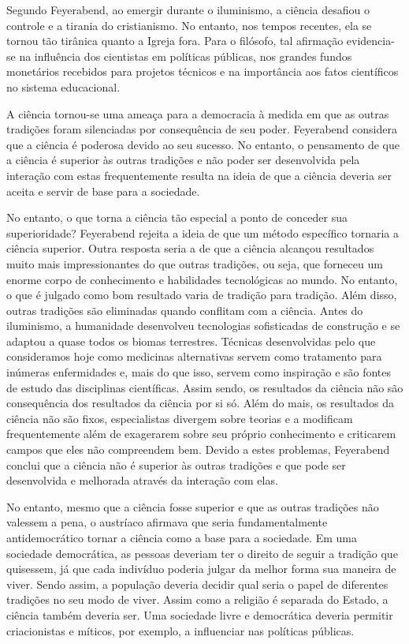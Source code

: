 \documentclass[12pt]{report}
\begin{document}
			Segundo Feyerabend, ao emergir durante o iluminismo, a ciência desafiou o controle e a tirania do cristianismo.
			No entanto, nos tempos recentes, ela se tornou tão tirânica quanto a Igreja fora.
			Para o filósofo, tal afirmação evidencia-se na influência dos cientistas em políticas públicas, nos grandes fundos monetários recebidos para projetos técnicos e na importância aos fatos científicos no sistema educacional.
		
			A ciência tornou-se uma ameaça para a democracia à medida em que as outras tradições foram silenciadas por consequência de seu poder.
			Feyerabend considera que a ciência é poderosa devido ao seu sucesso.
			No entanto, o pensamento de que a ciência é superior às outras tradições e não poder ser desenvolvida pela interação com estas frequentemente resulta na ideia de que a ciência deveria ser aceita e servir de base para a sociedade.
		
			No entanto, o que torna a ciência tão especial a ponto de conceder sua superioridade? Feyerabend rejeita a ideia de que um método específico tornaria a ciência superior.
			Outra resposta seria a de que a ciência alcançou resultados muito mais impressionantes do que outras tradições, ou seja, que forneceu um enorme corpo de conhecimento e habilidades tecnológicas ao mundo.
			No entanto, o que é julgado como bom resultado varia de tradição para tradição.
			Além disso, outras tradições são eliminadas quando conflitam com a ciência.
			Antes do iluminismo, a humanidade desenvolveu tecnologias sofisticadas de construção e se adaptou a quase todos os biomas terrestres.
			Técnicas desenvolvidas pelo que consideramos hoje como medicinas alternativas servem como tratamento para inúmeras enfermidades e, mais do que isso, servem como inspiração e são fontes de estudo das disciplinas científicas.
			Assim sendo, os resultados da ciência não são consequência dos resultados da ciência por si só.
			Além do mais, os resultados da ciência não são fixos, especialistas divergem sobre teorias e a modificam frequentemente além de exagerarem sobre seu próprio conhecimento e criticarem campos que eles não compreendem bem.
			Devido a estes problemas, Feyerabend conclui que a ciência não é superior às outras tradições e que pode ser desenvolvida e melhorada através da interação com elas.
			
			No entanto, mesmo que a ciência fosse superior e que as outras tradições não valessem a pena, o austríaco afirmava que seria fundamentalmente antidemocrático tornar a ciência como a base para a sociedade.
			Em uma sociedade democrática, as pessoas deveriam ter o direito de seguir a tradição que quisessem, já que cada indivíduo poderia julgar da melhor forma sua maneira de viver.
			Sendo assim, a população deveria decidir qual seria o papel de diferentes tradições no seu modo de viver.
			Assim como a religião é separada do Estado, a ciência também deveria ser.
			Uma sociedade livre e democrática deveria permitir criacionistas e míticos, por exemplo, a influenciar nas políticas públicas.
		
\end{document}
